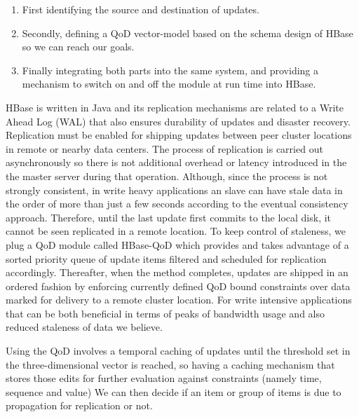 \begin{enumerate}
\item First identifying the source and destination of updates.
\item Secondly, defining a QoD vector-model based on the schema design of HBase so we can reach our goals.
\item Finally integrating both parts into the same system, and providing a mechanism to switch on and off the module at run time into HBase.
\end{enumerate}

HBase is written in Java and its replication mechanisms are related to a Write Ahead Log (WAL) that also ensures durability of updates and disaster recovery. Replication must be enabled for shipping updates between peer cluster locations in remote or nearby data centers. The process of replication is carried out asynchronously so there is not additional overhead or latency introduced in the the master server during that operation.  Although, since the process is not strongly consistent, in write heavy applications an slave can have stale data in the order of more than just a few seconds according to the eventual consistency approach. Therefore, until the last update first commits to the local disk, it cannot be seen replicated in a remote location. To keep control of staleness, we plug a QoD module called HBase-QoD which provides and takes advantage of a sorted priority queue of update items filtered and scheduled for replication accordingly. Thereafter, when the method completes, updates are shipped in an ordered fashion by enforcing currently defined QoD bound constraints over data marked for delivery to a remote cluster location. For write intensive applications that can be both beneficial in terms of peaks of bandwidth usage and also reduced staleness of data we believe.


Using the QoD involves a temporal caching of updates until the threshold set in the three-dimensional vector is reached, so having a caching mechanism that stores those edits for further evaluation against constraints (namely time, sequence and value) We can then decide if an item or group of items is due to propagation for replication or not.



